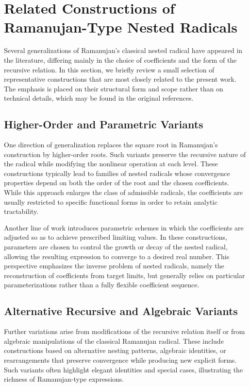 \documentclass[11pt,a4paper]{amsart}
\theoremstyle{plain}
\theoremstyle{definition}
\theoremstyle{remark}
\begin{document}
\section{Related Constructions of Ramanujan-Type Nested Radicals}
\label{sec:related}

Several generalizations of Ramanujan’s classical nested radical have appeared in the literature, differing mainly in the choice of coefficients and the form of the recursive relation. In this section, we briefly review a small selection of representative constructions that are most closely related to the present work. The emphasis is placed on their structural form and scope rather than on technical details, which may be found in the original references.

\subsection{Higher-Order and Parametric Variants}
\label{subsec:higher-order-parametric}

One direction of generalization replaces the square root in Ramanujan’s construction by higher-order roots. Such variants preserve the recursive nature of the radical while modifying the nonlinear operation at each level. These constructions typically lead to families of nested radicals whose convergence properties depend on both the order of the root and the chosen coefficients. While this approach enlarges the class of admissible radicals, the coefficients are usually restricted to specific functional forms in order to retain analytic tractability.

Another line of work introduces parametric schemes in which the coefficients are adjusted so as to achieve prescribed limiting values. In these constructions, parameters are chosen to control the growth or decay of the nested radical, allowing the resulting expression to converge to a desired real number. This perspective emphasizes the inverse problem of nested radicals, namely the reconstruction of coefficients from target limits, but generally relies on particular parameterizations rather than a fully flexible coefficient sequence.

\subsection{Alternative Recursive and Algebraic Variants}
\label{subsec:alternative-recursive}

Further variations arise from modifications of the recursive relation itself or from algebraic manipulations of the classical Ramanujan radical. These include constructions based on alternative nesting patterns, algebraic identities, or rearrangements that preserve convergence while producing new explicit forms. Such variants often highlight elegant identities and special cases, illustrating the richness of Ramanujan-type expressions.
\end{document}
